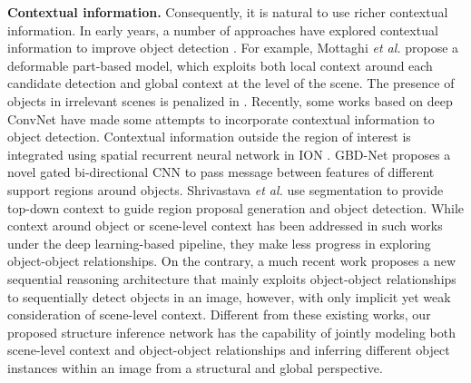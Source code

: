 \documentclass[10pt,twocolumn,letterpaper]{article}
\begin{document}
{\bf Contextual information.} Consequently, it is natural to use richer contextual information.
In early years, a number of approaches have explored contextual information to improve object detection \cite{TRC, LSC, SODC, AES, FST, EHC, CBVS}. For example,
Mottaghi {\em et al.} \cite{TRC} propose a deformable part-based model, which exploits both local context around each candidate detection and global context at the level of the scene.
The presence of objects in irrelevant scenes is penalized in \cite{CBVS}. 
Recently, some works \cite{ION, GBD, CPF} based on deep ConvNet have made some attempts to incorporate contextual information to object detection. Contextual information outside the region of interest is integrated using spatial recurrent neural network in ION \cite{ION}. GBD-Net \cite{GBD} proposes a novel gated bi-directional CNN to pass message between features of different support regions around objects. Shrivastava {\em et al.} \cite{CPF} use segmentation to provide top-down context to guide region proposal generation and object detection.
While context around object or scene-level context has been addressed in such works \cite{ION, GBD, CPF} under the deep learning-based pipeline, they make less progress in exploring object-object relationships. On the contrary, a much recent work \cite{SM} proposes a new sequential reasoning architecture that mainly exploits object-object relationships to sequentially detect objects in an image, however, with only implicit yet weak consideration of scene-level context. Different from these existing works, our proposed structure inference network has the capability of jointly modeling both scene-level context and object-object relationships and inferring different object instances within an image from a structural and global perspective.

% 
\end{document}
